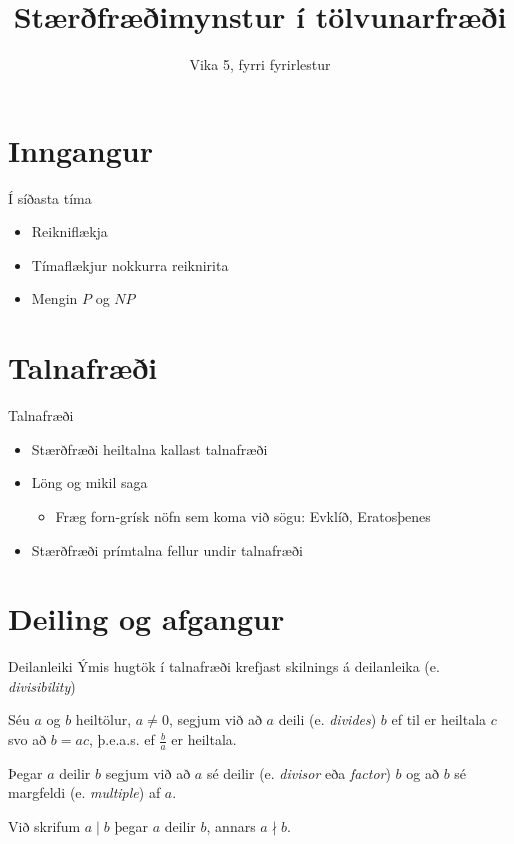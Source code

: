 \documentclass[handout]{beamer}
\title{Stærðfræðimynstur í tölvunarfræði}
\subtitle{Vika 5, fyrri fyrirlestur}
\begin{document}
\begin{frame}
\titlepage
\end{frame}


\section{Inngangur}

\begin{frame}{Í síðasta tíma}
\begin{itemize}
 \item Reikniflækja
 \item Tímaflækjur nokkurra reiknirita
 \item Mengin $P$ og $NP$
\end{itemize}
\end{frame}

\section{Talnafræði}

\begin{frame}{Talnafræði}
\begin{itemize}
 \item Stærðfræði heiltalna kallast talnafræði
 \item Löng og mikil saga
 \begin{itemize}
  \item Fræg forn-grísk nöfn sem koma við sögu: Evklíð, Eratosþenes
 \end{itemize}
 \item Stærðfræði prímtalna fellur undir talnafræði
\end{itemize}
\end{frame}

\section{Deiling og afgangur}

\begin{frame}{Deilanleiki}
Ýmis hugtök í talnafræði krefjast skilnings á deilanleika (e. \emph{divisibility})

\begin{tcolorbox}[title=Deilanleiki]
Séu $a$ og $b$ heiltölur, $a \neq 0$, segjum við að $a$ deili (e. \emph{divides}) $b$ ef til er heiltala $c$ svo að $b = ac$, þ.e.a.s. ef $\frac{b}{a}$ er heiltala.

Þegar $a$ deilir $b$ segjum við að $a$ sé deilir (e. \emph{divisor} eða \emph{factor}) $b$ og að $b$ sé margfeldi (e. \emph{multiple}) af $a$.

Við skrifum $a \mid b$ þegar $a$ deilir $b$, annars $a \nmid b$.
\end{tcolorbox}
\end{frame}
\end{document}
